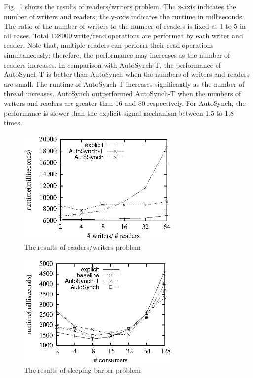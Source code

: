 \documentclass[preprint]{sigplanconf}
\begin{document}
Fig.~\ref{fig:rw_eval} shows the results of readers/writers problem. The
x-axis indicates the number of writers and readers; the y-axis indicates the
runtime in milliseconds. The ratio of the number of writers to the number of
readers is fixed at 1 to 5 in all cases. Total 128000 write/read operations are
performed by each writer and reader. Note that, multiple readers can perform
their read operations simultaneously; therefore, the performance may increases
as the number of readers increases. In comparison with AutoSynch-T, the
performance of AutoSynch-T is better than AutoSynch when the numbers of writers
and readers are small. The runtime of AutoSynch-T increases significantly as 
the number of thread increases. AutoSynch outperformed AutoSynch-T when the
numbers of writers and readers are greater than 16 and 80 respectively. For 
AutoSynch, the performance is slower than the explicit-signal mechanism between 
1.5 to 1.8 times.


\begin{figure}[ht!]
  \centering
  \includegraphics[width=80mm]{fig/trw.eps}
  \caption{The results of readers/writers problem}
  \label{fig:rw_eval}
\end{figure}

\begin{figure}[ht!]
  \centering
  \includegraphics[width=80mm]{fig/sb.eps}
  \caption{The results of sleeping barber problem}
  \label{fig:sb_eval}
\end{figure}
\end{document}
